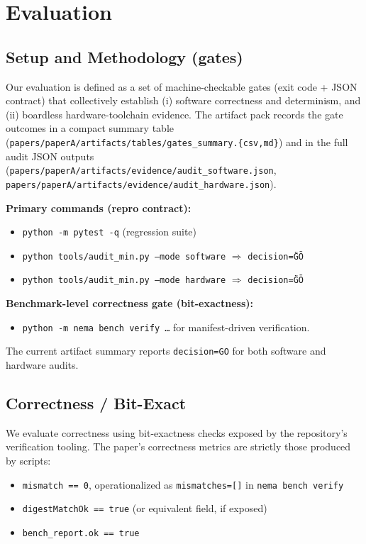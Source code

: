 \section{Evaluation}

\subsection{Setup and Methodology (gates)}

Our evaluation is defined as a set of machine-checkable gates (exit code + JSON contract) that collectively establish (i) software correctness and determinism, and (ii) boardless hardware-toolchain evidence. The artifact pack records the gate outcomes in a compact summary table (\texttt{papers/paperA/artifacts/tables/gates\_summary.\{csv,md\}}) and in the full audit JSON outputs (\texttt{papers/paperA/artifacts/evidence/audit\_software.json}, \texttt{papers/paperA/artifacts/evidence/audit\_hardware.json}).

\textbf{Primary commands (repro contract):}
\begin{itemize}
\item \texttt{python -m pytest -q} (regression suite)
\item \texttt{python tools/audit\_min.py --mode software} $\Rightarrow$ \texttt{decision=\"GO\"}
\item \texttt{python tools/audit\_min.py --mode hardware} $\Rightarrow$ \texttt{decision=\"GO\"}
\end{itemize}

\textbf{Benchmark-level correctness gate (bit-exactness):}
\begin{itemize}
\item \texttt{python -m nema bench verify \ldots} for manifest-driven verification.
\end{itemize}

The current artifact summary reports \texttt{decision=GO} for both software and hardware audits.

\subsection{Correctness / Bit-Exact}

We evaluate correctness using bit-exactness checks exposed by the repository's verification tooling. The paper's correctness metrics are strictly those produced by scripts:
\begin{itemize}
\item \texttt{mismatch == 0}, operationalized as \texttt{mismatches=[]} in \texttt{nema bench verify}
\item \texttt{digestMatchOk == true} (or equivalent field, if exposed)
\item \texttt{bench\_report.ok == true}
\end{itemize}


